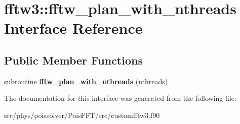 \hypertarget{interfacefftw3_1_1fftw__plan__with__nthreads}{}\section{fftw3\+:\+:fftw\+\_\+plan\+\_\+with\+\_\+nthreads Interface Reference}
\label{interfacefftw3_1_1fftw__plan__with__nthreads}
\subsection*{Public Member Functions}
\begin{DoxyCompactItemize}
\item 
subroutine {\bfseries fftw\+\_\+plan\+\_\+with\+\_\+nthreads} (nthreads)\hypertarget{interfacefftw3_1_1fftw__plan__with__nthreads_a896056d7e9165abe9ee42c8f99cc5aed}{}\label{interfacefftw3_1_1fftw__plan__with__nthreads_a896056d7e9165abe9ee42c8f99cc5aed}

\end{DoxyCompactItemize}


The documentation for this interface was generated from the following file\+:\begin{DoxyCompactItemize}
\item 
src/phys/poissolver/\+Pois\+F\+F\+T/src/customfftw3.\+f90\end{DoxyCompactItemize}
